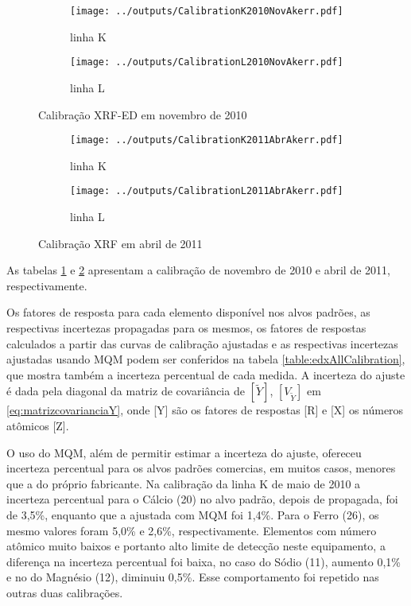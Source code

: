 \begin{figure}[H]
  \begin{subfigure}[b]{0.5\textwidth}
   \texttt{[image: ../outputs/CalibrationK2010NovAkerr.pdf]}
    \caption{linha K}
  \end{subfigure}
  \begin{subfigure}[b]{0.5\textwidth}
    \texttt{[image: ../outputs/CalibrationL2010NovAkerr.pdf]}
    \caption{linha L}
  \end{subfigure}
  \caption{Calibração XRF-ED em novembro de 2010 \label{fig:edx_calib_KLnov2010}}
\end{figure}

\newpage
\begin{figure}[H]
  \begin{subfigure}[b]{0.5\textwidth}
    \texttt{[image: ../outputs/CalibrationK2011AbrAkerr.pdf]}
    \caption{linha K}
  \end{subfigure}
  \begin{subfigure}[b]{0.5\textwidth}
    \texttt{[image: ../outputs/CalibrationL2011AbrAkerr.pdf]}
    \caption{linha L}
  \end{subfigure}
\caption{Calibração XRF em  abril de 2011 \label{fig:edx_calib_KLabr2011}}
\end{figure}

As tabelas \ref{fig:edx_calib_KLnov2010} e \ref{fig:edx_calib_KLabr2011}
apresentam a calibração de novembro de 2010 e abril de 2011, respectivamente.

Os fatores de resposta para cada elemento disponível nos alvos padrões, as 
respectivas incertezas propagadas para os mesmos, os fatores de respostas 
calculados a partir das curvas de calibração ajustadas e as respectivas 
incertezas ajustadas usando MQM podem ser conferidos na tabela 
\ref{table:edxAllCalibration}, que mostra também a incerteza percentual de 
cada medida. A incerteza do ajuste é dada pela diagonal da matriz de covariância 
de $[\tilde{Y}]$, $[V_{\tilde{Y}}]$ em \ref{eq:matrizcovarianciaY}, onde [Y] 
são os fatores de respostas [R] e [X] os números atômicos [Z].

O uso do MQM, além de permitir estimar a incerteza do ajuste, ofereceu incerteza
percentual para os alvos padrões comercias, em muitos casos, menores que a 
do próprio fabricante. Na calibração da linha K de maio de 2010 a 
incerteza percentual para o Cálcio (20) no alvo padrão, depois de propagada,
foi de 3,5\%, enquanto que a ajustada com MQM foi 1,4\%. Para o Ferro (26), os
mesmo valores foram 5,0\% e 2,6\%, respectivamente. Elementos com número atômico
muito baixos e portanto alto limite de detecção neste equipamento, a diferença 
na incerteza percentual foi baixa, no caso do Sódio (11), aumento 0,1\% e no 
do Magnésio (12), diminuiu 0,5\%. Esse comportamento foi repetido nas outras 
duas calibrações.

